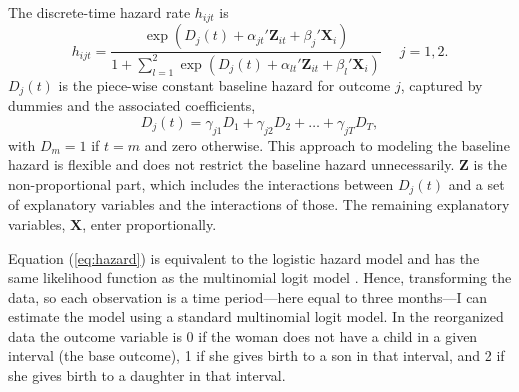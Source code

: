 \documentclass[12pt,letterpaper]{article}
\begin{document}
The discrete-time hazard rate $h_{ijt}$ is 
\begin{equation}
 h_{ijt} = \frac{\exp(D_j(t) + \alpha_{jt}'\mathbf{Z}_{it} + \beta_j'\mathbf{X}_{i})} 
 {1 + \sum_{l=1}^2 \exp(D_j(t) + \alpha_{lt}'\mathbf{Z}_{it} + \beta_l'\mathbf{X}_{i})} \: \: \; \; \;  j = 1,2.
 \label{eq:hazard}
\end{equation}
$D_{j}(t)$ is the piece-wise constant baseline hazard for outcome $j$, captured
by dummies and the associated coefficients,
\begin{equation}
D_j(t) = \gamma_{j1} D_1 + \gamma_{j2} D_2 + \ldots + \gamma_{jT} D_T,
\end{equation}
with $D_m = 1$ if $t=m$ and zero otherwise.
This approach to modeling the baseline hazard is flexible and does not restrict the 
baseline hazard unnecessarily.
$\mathbf{Z}$ is the non-proportional part, which includes the interactions between 
$D_j(t)$ and a set of explanatory variables and the interactions of those.
The remaining explanatory variables, $\mathbf{X}$, enter proportionally.




Equation (\ref{eq:hazard}) is equivalent to the logistic hazard model and has the same 
likelihood function as the multinomial logit model \citep{allison82,jenkins95}.
Hence, transforming the data, so each observation is a time period---here equal
to three months---I can estimate the model using a standard multinomial logit model.
%
In the reorganized data the outcome variable is 0 if the woman does not have a child in a 
given interval (the base outcome), 1 if she gives birth to a son in that interval, and 2 
if she gives birth to a daughter in that interval.
\end{document}
